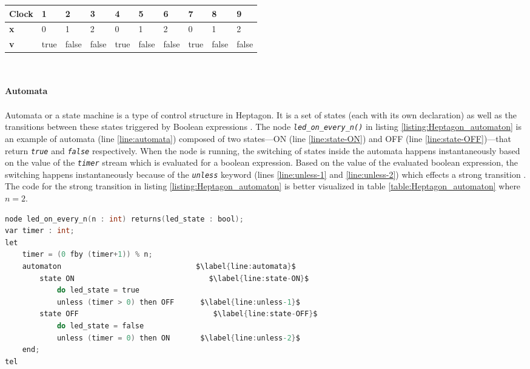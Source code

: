 \documentclass[10pt, a4paper]{article}
\newcommand{\textFunc}[1]{\texttt{\textit{#1}}}
\begin{document}
    \begin{minipage}{\linewidth}
    \centering
    \captionof{table}{Dataflow for \textFunc{everyn(3)} in listing \ref{listing:Heptagon_fby}.}
    \label{table:Heptagon_fby} 
    \begin{tabular}{ C{0.95in} *9{C{.38in}}}\toprule[1.5pt]
        \toprule[1.5pt]
        \bf Clock & 1 & 2 & 3 & 4 & 5 & 6 & 7 & 8 & 9\\
        \midrule
        \bf x & 0 & 1 & 2 & 0 & 1 & 2 & 0 & 1 & 2\\
        \midrule
        \bf v & true & false & false & true & false & false & true & false & false\\
        \bottomrule[1.25pt]
    \end{tabular}\par
    \end{minipage}
    \bigskip
    \\ \\
    \textbf{Automata}
    \\ \\
    Automata or a state machine is a type of control structure in Heptagon. It is a set of states (each with its own declaration) as well as the transitions between these states triggered by Boolean expressions \cite{report:heptagon_manual}. The node \textFunc{led\_on\_every\_n()} in listing \ref{listing:Heptagon_automaton} is an example of automata (line \ref{line:automata}) composed of two states---ON (line \ref{line:state-ON}) and OFF (line \ref{line:state-OFF})---that return \textFunc{true} and \textFunc{false} respectively. When the node is running, the switching of states inside the automata happens instantaneously based on the value of the \textFunc{timer} stream which is evaluated for a boolean expression. Based on the value of the evaluated boolean expression, the switching happens instantaneously because of the \textFunc{unless} keyword (lines \ref{line:unless-1} and \ref{line:unless-2}) which effects a strong transition \cite{report:heptagon_manual}. The code for the strong transition in listing \ref{listing:Heptagon_automaton} is better visualized in table \ref{table:Heptagon_automaton} where $n=2$.

    \begin{lstlisting}[caption={Sample Heptagon code with automaton control structure}, label={listing:Heptagon_automaton}, language=C]
node led_on_every_n(n : int) returns(led_state : bool);
var timer : int;
let
    timer = (0 fby (timer+1)) % n;
    automaton                               $\label{line:automata}$
        state ON                               $\label{line:state-ON}$
            do led_state = true
            unless (timer > 0) then OFF      $\label{line:unless-1}$
        state OFF                               $\label{line:state-OFF}$
            do led_state = false
            unless (timer = 0) then ON       $\label{line:unless-2}$
    end;
tel     \end{lstlisting}
\end{document}
